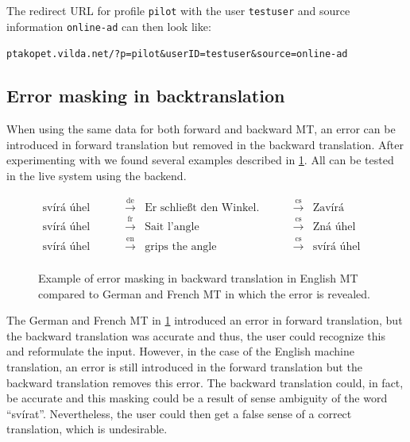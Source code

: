The redirect URL for profile \texttt{pilot} with the user \texttt{testuser} and source information \texttt{online-ad} can then look like:

\texttt{ptakopet.vilda.net/?p=pilot\&userID=testuser\&source=online-ad}

\subsection*{Error masking in backtranslation} \label{sec:error_masking}

When using the same data for both forward and backward MT, an error can be introduced in forward translation but removed in the backward translation. After experimenting with \ptakopet{} we found several examples described in \cref{fig:error_masking_example}. All can be tested in the live system using the  backend.

\begin{figure}[ht]
    \begin{align*}
        \text{svírá úhel} \hspace{1cm} &\xrightarrow{\text{de}} &\text{Er schließt den Winkel.} \hspace{1cm} &\xrightarrow{\text{cs}} &\text{Zavírá úhel.} \\
        \text{svírá úhel} \hspace{1cm} &\xrightarrow{\text{fr}} &\text{Sait l'angle} \hspace{1cm}  &\xrightarrow{\text{cs}} &\text{Zná úhel} \\
        \text{svírá úhel} \hspace{1cm} &\xrightarrow{\text{en}} &\text{grips the angle} \hspace{1cm}  &\xrightarrow{\text{cs}} &\text{svírá úhel} \\
    \end{align*}
    \caption{\label{fig:error_masking_example} Example of error masking in backward translation in English MT compared to German and French MT in which the error is revealed.}
\end{figure}

The German and French MT in \cref{fig:error_masking_example} introduced an error in forward translation, but the backward translation was accurate and thus, the user could recognize this and reformulate the input. However, in the case of the English machine translation, an error is still introduced in the forward translation but the backward translation removes this error. The backward translation could, in fact, be accurate and this masking could be a result of sense ambiguity of the word ``svírat''. Nevertheless, the user could then get a false sense of a correct translation, which is undesirable.


